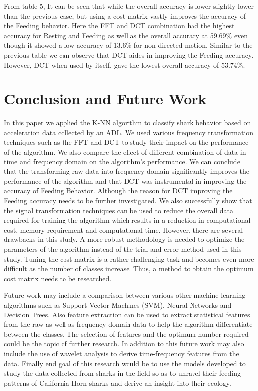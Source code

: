 \documentclass[conference]{IEEEtran}
\begin{document}
From table 5, It can be seen that while the overall accuracy is lower slightly lower than the previous case, but using a cost matrix vastly improves the accuracy of the Feeding behavior. Here the FFT and DCT combination had the highest accuracy for Resting and Feeding as well as the overall accuracy at 59.69\% even though it showed a low accuracy of 13.6\% for non-directed motion. Similar to the previous table we can observe that DCT aides in improving the Feeding accuracy. However, DCT when used by  itself,  gave the lowest overall accuracy of 53.74\%. 

\section{Conclusion and Future Work}
In this paper we applied the K-NN algorithm to classify shark behavior based on acceleration data collected by an ADL. We used various frequency transformation techniques such as the FFT and DCT to study their impact on the performance of the algorithm. We also compare the effect of different combination of data in time and frequency domain on the algorithm’s performance. We can conclude that the transforming raw data into frequency domain significantly improves the performance of the algorithm and that DCT was instrumental in improving the accuracy of Feeding Behavior. Although the reason for DCT improving the Feeding accuracy needs to be further investigated. We also successfully show that the signal transformation techniques can be used to reduce the overall data required for training the algorithm which results in a reduction in computational cost, memory requirement and computational time. However, there are several drawbacks in this study. A more robust methodology is needed to optimize the parameters of the algorithm instead of the trial and error method used in this study. Tuning the cost matrix is a rather challenging task and becomes even more difficult as the number of classes increase. Thus, a method to obtain the optimum cost matrix needs to be researched.

Future work may include a comparison between various other machine learning algorithms such as Support Vector Machines (SVM), Neural Networks and Decision Trees. Also feature extraction can be used to extract statistical features from the raw as well as frequency domain data to help the algorithm differentiate between the classes. The selection of features and the optimum number required could be the topic of further research. In addition to this future work may also include the use of wavelet analysis to derive time-frequency features from the data. Finally end goal of this research would be to use the models developed to study the data collected from sharks in the field so as to unravel their feeding patterns of California Horn sharks and derive an insight into their ecology.



\end{document}
